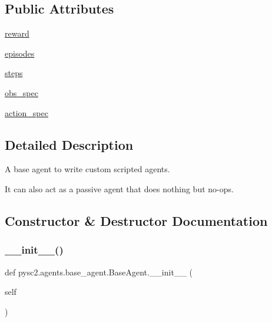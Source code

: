 \subsection*{Public Attributes}
\begin{DoxyCompactItemize}
\item 
\mbox{\hyperlink{classpysc2_1_1agents_1_1base__agent_1_1_base_agent_a9081eba1a1a529a08d1309e35a1f7ad9}{reward}}
\item 
\mbox{\hyperlink{classpysc2_1_1agents_1_1base__agent_1_1_base_agent_a46c85c12c80d0ceceff90c5889f0a13a}{episodes}}
\item 
\mbox{\hyperlink{classpysc2_1_1agents_1_1base__agent_1_1_base_agent_aac3b906e1bc4bfc1fad84e8a1fb6ef87}{steps}}
\item 
\mbox{\hyperlink{classpysc2_1_1agents_1_1base__agent_1_1_base_agent_ad6cefb81724b9d234887cea543c4f06e}{obs\+\_\+spec}}
\item 
\mbox{\hyperlink{classpysc2_1_1agents_1_1base__agent_1_1_base_agent_a550b216b98ae40b2da1b2fd9015d3019}{action\+\_\+spec}}
\end{DoxyCompactItemize}


\subsection{Detailed Description}
\begin{DoxyVerb}A base agent to write custom scripted agents.

It can also act as a passive agent that does nothing but no-ops.
\end{DoxyVerb}
 

\subsection{Constructor \& Destructor Documentation}
\mbox{\label{classpysc2_1_1agents_1_1base__agent_1_1_base_agent_a03935d754145f417240d25e0192c57bc}} 
\subsubsection{\texorpdfstring{\+\_\+\+\_\+init\+\_\+\+\_\+()}{\_\_init\_\_()}}
{\footnotesize\ttfamily def pysc2.\+agents.\+base\+\_\+agent.\+Base\+Agent.\+\_\+\+\_\+init\+\_\+\+\_\+ (\begin{DoxyParamCaption}\item[{}]{self }\end{DoxyParamCaption})}



